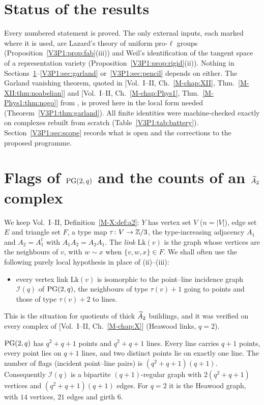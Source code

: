 \section*{Status of the results}

Every numbered statement is proved. The only external inputs, each marked where it is used, are
Lazard's theory of uniform pro-$\ell$ groups (Proposition~\ref{V3P1:prop:fab}(iii)) and
Weil's identification of the tangent space of a representation variety
(Proposition~\ref{V3P1:prop:rigid}(ii)). Nothing in Sections~\ref{V3P1:sec:flags}--\ref{V3P1:sec:garland}
or~\ref{V3P1:sec:pencil} depends on either. The Garland vanishing theorem, quoted in
[Vol.~I--II, Ch.~\ref{M-chap:XII}, Thm.~\ref{M-XII:thm:noabelian}] and [Vol.~I--II, Ch.~\ref{M-chap:Phys1}, Thm.~\ref{M-Phys1:thm:nogo}]
from \cite{Ga,BSw}, is proved here in the local form needed (Theorem~\ref{V3P1:thm:garland}).
All finite identities were machine-checked exactly on complexes rebuilt from scratch
(Table~\ref{V3P1:tab:battery}). Section~\ref{V3P1:sec:scope} records what is open and the
corrections to the proposed programme.

\section{Flags of \texorpdfstring{$\mathrm{PG}(2,q)$}{PG(2,q)} and the counts of an \texorpdfstring{$\widetilde A_2$}{A2} complex}\label{V3P1:sec:flags}

We keep Vol.~I--II, Definition~\ref{M-X:def:a2}: $Y$ has vertex set $V$ ($n=|V|$), edge set $E$ and triangle
set $F$, a type map $\tau\colon V\to\mathbb{Z}/3$, the type-increasing adjacency $A_1$ and $A_2=A_1^{t}$
with $A_1A_2=A_2A_1$. The \emph{link} $\mathrm{Lk}(v)$ is the graph whose vertices are the
neighbours of $v$, with $w\sim x$ when $\{v,w,x\}\in F$. We shall often use the following
purely local hypothesis in place of (ii)--(iii):
\begin{itemize}
\item[(L)] every vertex link $\mathrm{Lk}(v)$ is isomorphic to the point--line incidence graph
$\mathcal I(q)$ of $\mathrm{PG}(2,q)$, the neighbours of type $\tau(v)+1$ going to points and those of
type $\tau(v)+2$ to lines.
\end{itemize}
This is the situation for quotients of thick $\widetilde A_2$ buildings, and it was verified on every
complex of [Vol.~I--II, Ch.~\ref{M-chap:X}] (Heawood links, $q=2$).

\begin{lemma}\label{V3P1:lem:pg}
$\mathrm{PG}(2,q)$ has $q^{2}+q+1$ points and $q^{2}+q+1$ lines. Every line carries $q+1$ points,
every point lies on $q+1$ lines, and two distinct points lie on exactly one line. The number
of flags \textup{(}incident point--line pairs\textup{)} is $(q^{2}+q+1)(q+1)$. Consequently
$\mathcal I(q)$ is a bipartite $(q+1)$-regular graph with $2(q^{2}+q+1)$ vertices and
$(q^{2}+q+1)(q+1)$ edges. For $q=2$ it is the Heawood graph, with $14$ vertices, $21$ edges
and girth $6$.
\end{lemma}

